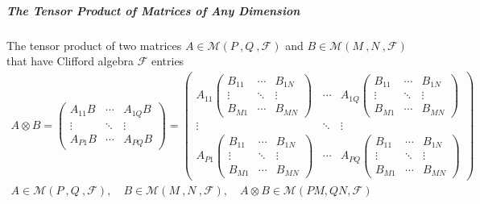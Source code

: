 \documentclass[aps,preprint]{revtex4}
\begin{document}
\subparagraph{The Tensor Product of Matrices of Any Dimension \label{The
Tensor Product of Matrices of Any Dimension}}

The tensor product of two matrices $A\in \mathcal{M}\left( P\ ,Q\ ,\mathcal{F%
}\right) $ and $B\in \mathcal{M}\left( M\ ,N\ ,\mathcal{F}\right) $ that
have Clifford algebra $\mathcal{F}$ entries 
\begin{gather}
A\otimes B=\left( 
\begin{array}{ccc}
A_{11}B & \cdots & A_{1Q}B \\ 
\vdots & \ddots & \vdots \\ 
A_{P1}B & \cdots & A_{PQ}B%
\end{array}%
\right) =\left( 
\begin{array}{ccc}
A_{11}\left( 
\begin{array}{ccc}
B_{11} & \cdots & B_{1N} \\ 
\vdots & \ddots & \vdots \\ 
B_{M1} & \cdots & B_{MN}%
\end{array}%
\right) & \cdots & A_{1Q}\left( 
\begin{array}{ccc}
B_{11} & \cdots & B_{1N} \\ 
\vdots & \ddots & \vdots \\ 
B_{M1} & \cdots & B_{MN}%
\end{array}%
\right) \\ 
\vdots & \ddots & \vdots \\ 
A_{P1}\left( 
\begin{array}{ccc}
B_{11} & \cdots & B_{1N} \\ 
\vdots & \ddots & \vdots \\ 
B_{M1} & \cdots & B_{MN}%
\end{array}%
\right) & \cdots & A_{PQ}\left( 
\begin{array}{ccc}
B_{11} & \cdots & B_{1N} \\ 
\vdots & \ddots & \vdots \\ 
B_{M1} & \cdots & B_{MN}%
\end{array}%
\right)%
\end{array}%
\right) \\
A\in \mathcal{M}\left( P\ ,Q\ ,\mathcal{F}\right) ,\quad B\in \mathcal{M}%
\left( M\ ,N\ ,\mathcal{F}\right) ,\quad A\otimes B\in \mathcal{M}\left(
PM,QN,\mathcal{F}\right)
\end{gather}
\end{document}
